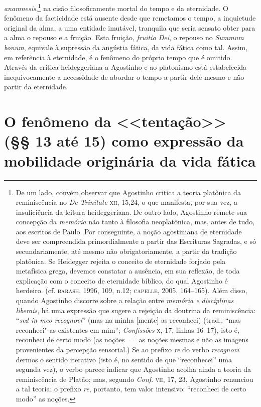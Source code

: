 \emph{anamnesis},\footnote{ De um lado, convém observar que
Agostinho critica a teoria platônica da reminiscência no
\emph{De Trinitate} \textsc{xii}, 15,24, o que manifesta, por sua vez,
a insuficiência da leitura heideggeriana. De outro lado,
Agostinho remete sua concepção da\emph{ memória} não tanto à
filosofia neoplatônica, mas, antes de tudo, aos escritos de
Paulo. Por conseguinte, a noção agostiniana de eternidade deve
ser compreendida primordialmente a partir das Escrituras
Sagradas, e só secundariamente, até mesmo não obrigatoriamente,
a partir da tradição platônica. Se Heidegger rejeita o conceito
de eternidade forjado pela metafísica grega, devemos constatar a
ausência, em sua reflexão, de toda explicação com o conceito de
eternidade bíblico, do qual Agostinho é herdeiro. (cf. \textsc{barash},
1996, 109, n.12; \textsc{capelle}, 2005, 164--165). Além disso, quando
Agostinho discorre sobre a relação entre \emph{memória e
disciplinas liberais}, há uma expressão que sugere a rejeição da
doutrina da reminiscência: “\emph{sed in meo recognovi}'' (mas
na minha [mente] as reconheci) (trad.: “mas reconheci"-as
existentes em mim”; \emph{Confissões} \textsc{x}, 17, linhas 16--17),
isto é, reconheci de certo modo (as noções $=$ as noções mesmas e
não as imagens provenientes da percepção sensorial.) Se ao
prefixo {\emph{re}} do verbo \emph{recognovi} dermos
o sentido iterativo (isto é, no sentido de que “reconhecei” uma
segunda vez), o verbo parece indicar que Agostinho acolha ainda
a teoria da reminiscência de Platão; mas, segundo \emph{Conf}.
\textsc{vii}, 17, 23, Agostinho renunciou a tal teoria; o prefixo
{\emph{re}}, portanto, tem valor intensivo: “reconheci
de certo modo” as noções.} na cisão filosoficamente mortal
do tempo e da eternidade. O fenômeno da facticidade está ausente
desde que remetamos o tempo, a inquietude original da alma, a
uma entidade imutável, tranquila que seria sensato obter para a
alma o repouso e a fruição. Esta fruição, \emph{fruitio Dei},
o repouso no \emph{Summum bonum}, equivale à supressão da
angústia fática, da vida fática como tal. Assim, em referência à
eternidade, é o fenômeno do próprio tempo que é omitido. Através
da crítica heideggeriana a Agostinho e ao platonismo está
estabelecida inequivocamente a necessidade de abordar o tempo a
partir dele mesmo e não partir da eternidade.  

\section{O fenômeno da <<tentação>> (§§ 13 até 15) como
expressão da mobilidade originária da vida fática}

